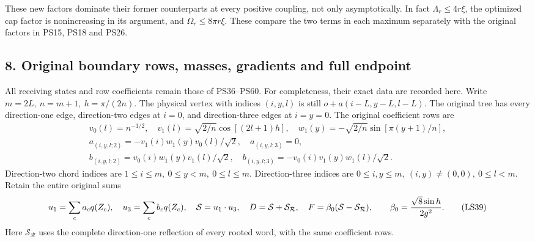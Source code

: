 \documentclass[11pt]{article}
\begin{document}
These new factors dominate their former counterparts at every
positive coupling, not only asymptotically. In fact
\(\Lambda_r\le4r\xi\), the optimized cap factor is nonincreasing
in its argument, and
\(\Omega_r\le8\pi r\xi\). These compare the two terms in each
maximum separately with the original factors in PS15,
PS18 and PS26.

\subsection*{8. Original boundary rows, masses, gradients and full endpoint}

All receiving states and row coefficients remain those of
PS36–PS60. For completeness, their exact data are recorded here.
Write \(m=2L,\ n=m+1,\ h=\pi/(2n)\). The physical vertex with
indices \((i,y,l)\) is still \(o+a(i-L,y-L,l-L)\).
The original tree has every direction-one edge, direction-two
edges at \(i=0\), and direction-three edges at \(i=y=0\).
The original coefficient rows are
\[
 \begin{gathered}
 v_0(l)=n^{-1/2},\quad
 v_1(l)=\sqrt{2/n}\cos[(2l+1)h],\quad
 w_1(y)=-\sqrt{2/n}\sin[\pi(y+1)/n],\\
 a_{(i,y,l;2)}=-v_1(i)w_1(y)v_0(l)/\sqrt2,\quad
 a_{(i,y,l;3)}=0,\\
 b_{(i,y,l;2)}=v_0(i)w_1(y)v_1(l)/\sqrt2,\quad
 b_{(i,y,l;3)}=-v_0(i)v_1(y)w_1(l)/\sqrt2.
 \end{gathered}
 \tag{LS38}
\]
Direction-two chord indices are
\(1\le i\le m,\ 0\le y<m,\ 0\le l\le m\).
Direction-three indices are
\(0\le i,y\le m,\ (i,y)\ne(0,0),\ 0\le l<m\).
Retain the entire original sums
\[
 u_1=\sum_ca_cq(Z_c),\quad u_3=\sum_cb_cq(Z_c),\quad
 \mathcal S=u_1\cdot u_3,\quad
 D=\mathcal S+\mathcal S_{\mathcal R},\quad
 F=\beta_0(\mathcal S-\mathcal S_{\mathcal R}),\qquad
 \beta_0={\sqrt8\sin h\over2g^2}.
 \tag{LS39}
\]
Here \(\mathcal S_{\mathcal R}\) uses the complete direction-one
reflection of every rooted word, with the same coefficient rows.
\end{document}
